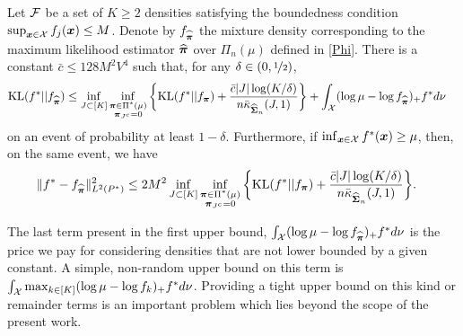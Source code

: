 \begin{proposition}\label{prop:2}
	Let $\cal F$ be a set of $K\ge 2$ densities satisfying the boundedness condition
	$\sup_{\boldsymbol x\in\mathcal X} f_j(\boldsymbol x)\le M$. Denote by $f_{\widehat{\boldsymbol \pi}}$ the mixture density
	corresponding to the maximum likelihood estimator $\widehat{\boldsymbol \pi}$ over $\Pi_n(\mu)$
	defined in \eqref{Phi}. There is a constant $\bar c\le 128 M^2V^4$ such that,
	for any $\delta \in (0,\nicefrac12)$,
	\begin{align}
	{\rm KL}(f^*|| f_{\widehat{\boldsymbol \pi}}) &\leq \inf_{J\subset [K]}
	\inf_{\substack{\boldsymbol \pi \in \Pi^*(\mu)\\ \boldsymbol \pi_{J^c}=0}}\bigg\{ {\rm KL}(f^*|| f_{\boldsymbol \pi})
	+ \frac{\bar c|J|\log(K/\delta)}{n\bar\kappa_{\widehat{\boldsymbol\Sigma}_n}(J,1)}\bigg\} +
	\int_{\mathcal X}(\log\mu-\log f_{\widehat{\boldsymbol \pi}})_+f^*d\nu
	\label{boundDevFive}
	\end{align}
	on an event of probability at least $1-\delta$. Furthermore, if $\inf_{\boldsymbol x\in\mathcal X} f^*(\boldsymbol x)
	\ge \mu$, then, on the same event, we have
	\begin{align}
	\|f^*-f_{\widehat{\boldsymbol \pi}}\|_{L^2(P^*)}^2
	&\leq 2M^2\inf_{J\subset [K]}\inf_{\substack{\boldsymbol \pi \in \Pi^*(\mu)\\ \boldsymbol \pi_{J^c}=0}}
	\bigg\{ {\rm KL}(f^*|| f_{\boldsymbol \pi}) + \frac{\bar c|J|\log(K/\delta)}{
		n\bar\kappa_{\widehat{\boldsymbol\Sigma}_n}(J,1)}\bigg\}.
	\label{boundDevSix}
	\end{align}
\end{proposition}

The last term present in the first upper bound,  $\int_{\mathcal X}(\log\mu-\log f_{\widehat{\boldsymbol \pi}})_+f^*d\nu$
is the price we pay for considering densities that are not lower bounded by a given constant.
A simple, non-random upper bound on this term is $\int_{\mathcal X}\max_{k\in [K]}(\log\mu-\log f_k)_+f^*d\nu$.
Providing a tight upper bound on this kind or remainder terms is an important problem which lies
beyond the scope of the present work.





